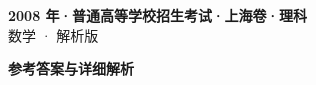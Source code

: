 \documentclass[zihao=-4, a4paper]{ctexart}
\begin{document}
\begin{center}
  {\Large\bfseries 2008 年·普通高等学校招生考试·上海卷·理科}\\[4pt]
  {\large 数学 · 解析版}
\end{center}
\medskip
{}

\clearpage
{}
\begin{center}{\Large\bfseries 参考答案与详细解析}\end{center}
\medskip

\end{document}
